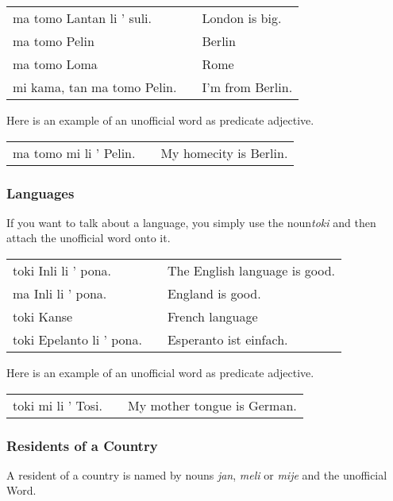 \begin{supertabular}{p{5,5cm}|ll}
ma tomo Lantan li ' suli. && London is big. \\
ma tomo Pelin && Berlin \\
ma tomo Loma && Rome \\
mi kama, tan ma tomo Pelin. && I'm from Berlin. \\
\end{supertabular} 

Here is an example of an unofficial word as predicate adjective.

\begin{supertabular}{p{5,5cm}|ll}
ma tomo mi li ' Pelin. && My homecity is Berlin.  \\
\end{supertabular}

%
\subsubsection*{Languages}
%
If you want to talk about a language, you simply use the noun\textit{toki} and then attach the unofficial word onto it. 

\begin{supertabular}{p{5,5cm}|ll}
toki Inli li ' pona. && The English language is good. \\
ma Inli li ' pona. && England is good. \\
toki Kanse && French language \\
toki Epelanto li ' pona. && Esperanto ist einfach. \\
\end{supertabular} 

Here is an example of an unofficial word as predicate adjective.

\begin{supertabular}{p{5,5cm}|ll}
toki mi li ' Tosi. && My mother tongue is German. \\
\end{supertabular}

%
\subsubsection*{Residents of a Country}
%
A resident of a country is named by nouns \textit{jan}, \textit{meli} or \textit{mije} and the unofficial Word.

